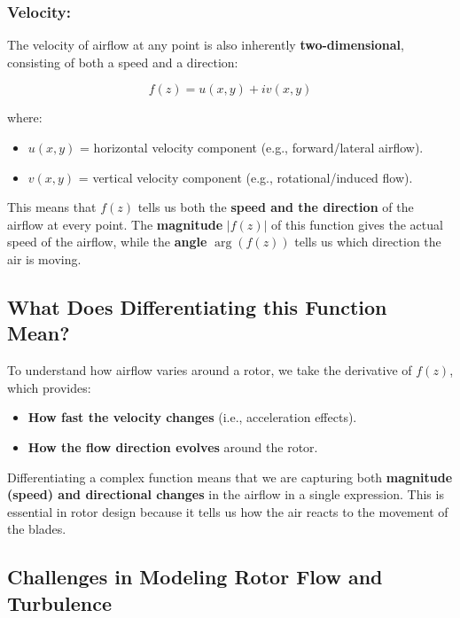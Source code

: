 \documentclass[a4paper,10.5pt]{article}
\begin{document}
\subsubsection{Velocity:}

The velocity of airflow at any point is also inherently \textbf{two-dimensional}, consisting of both a speed and a direction:

\begin{equation}
    f(z) = u(x, y) + iv(x, y)
\end{equation}

where:

\begin{itemize}
    \item $u(x, y)$ = horizontal velocity component (e.g., forward/lateral airflow).
    \item $v(x, y)$ = vertical velocity component (e.g., rotational/induced flow).
\end{itemize}

This means that $f(z)$ tells us both the \textbf{speed and the direction} of the airflow at every point. The \textbf{magnitude} $|f(z)|$ of this function gives the actual speed of the airflow, while the \textbf{angle} $\arg(f(z))$ tells us which direction the air is moving.

\subsection{What Does Differentiating this Function Mean?}

To understand how airflow varies around a rotor, we take the derivative of $f(z)$, which provides:

\begin{itemize}
    \item \textbf{How fast the velocity changes} (i.e., acceleration effects).
    \item \textbf{How the flow direction evolves} around the rotor.
\end{itemize}

Differentiating a complex function means that we are capturing both \textbf{magnitude (speed) and directional changes} in the airflow in a single expression. This is essential in rotor design because it tells us how the air reacts to the movement of the blades.

\subsection{Challenges in Modeling Rotor Flow and Turbulence}
\end{document}
